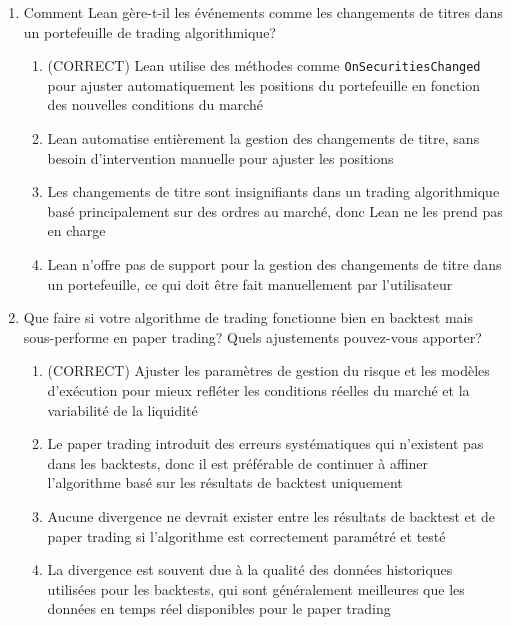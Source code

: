 \documentclass[a4paper,12pt]{article}
\begin{document}
\begin{enumerate}
    \item Comment Lean gère-t-il les événements comme les changements de titres dans un portefeuille de trading algorithmique?
    \begin{enumerate}[label=(\Alph*)]
        \item (CORRECT) Lean utilise des méthodes comme \texttt{OnSecuritiesChanged} pour ajuster automatiquement les positions du portefeuille en fonction des nouvelles conditions du marché
        \item Lean automatise entièrement la gestion des changements de titre, sans besoin d'intervention manuelle pour ajuster les positions
        \item Les changements de titre sont insignifiants dans un trading algorithmique basé principalement sur des ordres au marché, donc Lean ne les prend pas en charge
        \item Lean n'offre pas de support pour la gestion des changements de titre dans un portefeuille, ce qui doit être fait manuellement par l'utilisateur
    \end{enumerate}

    \item Que faire si votre algorithme de trading fonctionne bien en backtest mais sous-performe en paper trading? Quels ajustements pouvez-vous apporter?
    \begin{enumerate}[label=(\Alph*)]
        \item (CORRECT) Ajuster les paramètres de gestion du risque et les modèles d'exécution pour mieux refléter les conditions réelles du marché et la variabilité de la liquidité
        \item Le paper trading introduit des erreurs systématiques qui n'existent pas dans les backtests, donc il est préférable de continuer à affiner l'algorithme basé sur les résultats de backtest uniquement
        \item Aucune divergence ne devrait exister entre les résultats de backtest et de paper trading si l'algorithme est correctement paramétré et testé
        \item La divergence est souvent due à la qualité des données historiques utilisées pour les backtests, qui sont généralement meilleures que les données en temps réel disponibles pour le paper trading
    \end{enumerate}


\end{enumerate}
\end{document}
